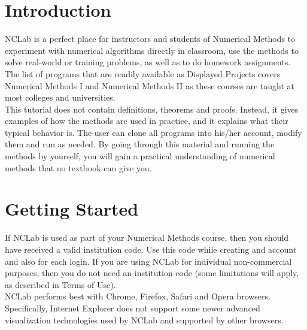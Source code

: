 \documentclass{article}
\begin{document}
\normalsize

\newpage
\setcounter{tocdepth}{2}
\tableofcontents

\newpage

\pagestyle{plain}
\setcounter{page}{1}


\newpage

\pagestyle{plain}
\section{Introduction}

NCLab is a perfect place for instructors and students of Numerical Methods 
to experiment with numerical algorithms directly in classroom, use the methods
to solve real-world or training problems, as well as to do homework assignments. 
The list of programs that are readily available as Displayed Projects covers 
Numerical Methods I and Numerical Methods II as these courses are 
taught at most colleges and universities. \\

\noindent
This tutorial does not contain definitions, theorems and proofs. Instead, it 
gives examples of how the methods are used in practice, and it explains what 
their typical behavior is. The user can clone all programs into his/her account,
modify them and run as needed.
By going through this material and running the methods by yourself, you will 
gain a practical understanding of numerical methods that no textbook can give you. 

\section{Getting Started}

If NCLab is used as part of your Numerical Methods course, then you should 
have received a valid institution code. Use this code while creating 
and account and also for each login. If you are using NCLab for individual
non-commercial purposes, then you do not need an institution code (some 
limitations will apply, as described in Terms of Use). \\

\noindent
NCLab performs best 
with Chrome, Firefox, Safari and Opera browsers. Specifically, Internet Explorer
does not support some newer advanced visualization technologies used by NCLab 
and supported by other browsers. \\
\end{document}

